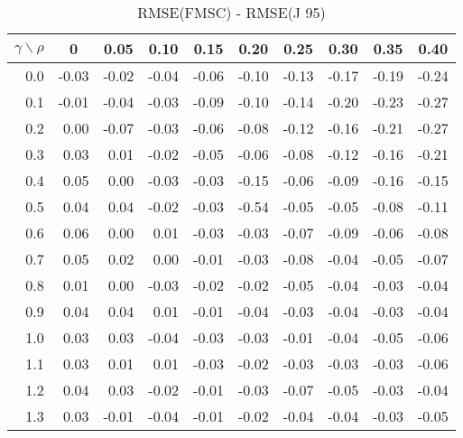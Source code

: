 \documentclass[12pt]{article}
\begin{document}
%
\begin{table}[!tbp]
\caption{RMSE(FMSC) - RMSE(J 95)}
 \begin{center}
 \begin{tabular}{r|rrrrrrrrr}\hline\hline
\multicolumn{1}{c|}{$\gamma\backslash\rho$}&\multicolumn{1}{c}{0}&\multicolumn{1}{c}{0.05}&\multicolumn{1}{c}{0.10}&\multicolumn{1}{c}{0.15}&\multicolumn{1}{c}{0.20}&\multicolumn{1}{c}{0.25}&\multicolumn{1}{c}{0.30}&\multicolumn{1}{c}{0.35}&\multicolumn{1}{c}{0.40}\tabularnewline
\hline

0.0&-0.03&-0.02&-0.04&-0.06&-0.10&-0.13&-0.17&-0.19&-0.24\tabularnewline
0.1&-0.01&-0.04&-0.03&-0.09&-0.10&-0.14&-0.20&-0.23&-0.27\tabularnewline
0.2& 0.00&-0.07&-0.03&-0.06&-0.08&-0.12&-0.16&-0.21&-0.27\tabularnewline
0.3& 0.03& 0.01&-0.02&-0.05&-0.06&-0.08&-0.12&-0.16&-0.21\tabularnewline
0.4& 0.05& 0.00&-0.03&-0.03&-0.15&-0.06&-0.09&-0.16&-0.15\tabularnewline
0.5& 0.04& 0.04&-0.02&-0.03&-0.54&-0.05&-0.05&-0.08&-0.11\tabularnewline
0.6& 0.06& 0.00& 0.01&-0.03&-0.03&-0.07&-0.09&-0.06&-0.08\tabularnewline
0.7& 0.05& 0.02& 0.00&-0.01&-0.03&-0.08&-0.04&-0.05&-0.07\tabularnewline
0.8& 0.01& 0.00&-0.03&-0.02&-0.02&-0.05&-0.04&-0.03&-0.04\tabularnewline
0.9& 0.04& 0.04& 0.01&-0.01&-0.04&-0.03&-0.04&-0.03&-0.04\tabularnewline
1.0& 0.03& 0.03&-0.04&-0.03&-0.03&-0.01&-0.04&-0.05&-0.06\tabularnewline
1.1& 0.03& 0.01& 0.01&-0.03&-0.02&-0.03&-0.03&-0.03&-0.06\tabularnewline
1.2& 0.04& 0.03&-0.02&-0.01&-0.03&-0.07&-0.05&-0.03&-0.04\tabularnewline
1.3& 0.03&-0.01&-0.04&-0.01&-0.02&-0.04&-0.04&-0.03&-0.05\tabularnewline
\hline
\end{tabular}

\end{center}

\end{table}
\end{document}
